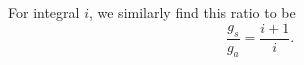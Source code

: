 For integral $i$, we similarly find this ratio to be
\begin{equation}
 \frac{g_s}{g_a}=\frac{i+1}{i}.
 \tag{86.2}
\end{equation}
